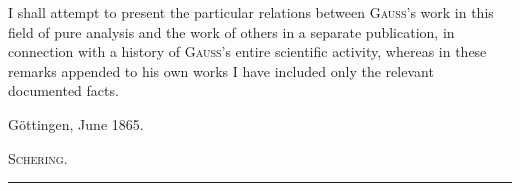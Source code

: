 I shall attempt to present the particular relations between \textsc{Gauss}’s work in this field of pure analysis and the work of others in a separate publication, in connection with a history of \textsc{Gauss}’s entire scientific activity, whereas in these remarks appended to his own works I have included only the relevant documented facts.

\par Göttingen, June 1865.
\begin{flushright}
\textsc{Schering}.
\end{flushright}
\begin{center}
\rule{0.27\linewidth}{0.2pt}
\end{center}

\clearpage
\endgroup
